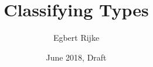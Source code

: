 \documentclass[twosided]{memoir}
\title{Classifying Types}
\author{Egbert Rijke}
\date{June 2018, Draft}
\begin{document}
\frontmatter

\begin{titlingpage}
\maketitle
\end{titlingpage}

\begin{comment}
\clearpage
\thispagestyle{empty}
\par
\vspace*{.35\textheight}{\begin{flushright}With infinite gratitude I dedicate this thesis to my parents.\par\end{flushright}}

\clearpage
\end{comment}

\tableofcontents



\mainmatter























%



\backmatter

\printbibliography
\end{document}
